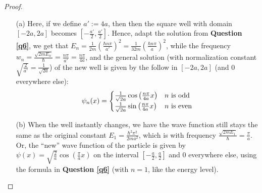 \documentclass{article}
\begin{document}
\begin{proof}

    \hfil

    \begin{itemize}
        \item[(a)] Here, if we define $a':=4a$, then then the square well with domain $[-2a,2a]$ becomes $[-\frac{a'}{2},\frac{a'}{2}]$. Hence, adapt the solution from \textbf{Question \ref{q6}}, we get that $E_n=\frac{1}{2m}\left(\frac{\hbar n\pi}{a'}\right)^2 = \frac{1}{32m}\left(\frac{\hbar n\pi}{a}\right)^2$, while the frequency $w_n=\frac{\sqrt{2m E_n}}{\hbar} = \frac{n\pi}{a'}=\frac{n\pi}{4a}$, and the general solution (with normalization constant $\sqrt{\frac{2}{a'}}=\frac{1}{\sqrt{2a}}$) of the new well is given by the follow in $[-2a,2a]$ (and $0$ everywhere else):
        \begin{align}
            \psi_n(x)=\begin{cases}
                \frac{1}{\sqrt{2a}}\cos\left(\frac{n\pi}{4a}x\right) & n \textmd{ is odd}\\
                \frac{1}{\sqrt{2a}}\sin\left(\frac{n\pi}{4a}x\right) & n \textmd{ is even}
            \end{cases}
        \end{align}

        \item[(b)] When the well instantly changes, we have the wave function still stays the same as the original constant $E_1=\frac{\hbar^2\pi^2}{2ma^2}$, which is with frequency $\frac{\sqrt{2m E_1}}{\hbar}=\frac{\pi}{a}$. Or, the ``new'' wave function of the particle is given by $\psi(x)=\sqrt{\frac{2}{a}}\cos\left(\frac{\pi}{a}x\right)$ on the interval $[-\frac{a}{2},\frac{a}{2}]$ and $0$ everywhere else, using the formula in \textbf{Question \ref{q6}} (with $n=1$, like the energy level).
        

\end{itemize}
\end{proof}
\end{document}
